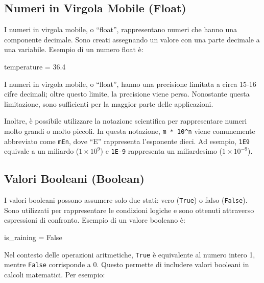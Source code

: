 \documentclass[
  letterpaper,
  krantz2]{{[}./krantz{]}}
\newenvironment{Shaded}{\begin{snugshade}}{\end{snugshade}}
\newcommand{\FloatTok}[1]{\textcolor[rgb]{0.68,0.00,0.00}{#1}}
\newcommand{\NormalTok}[1]{\textcolor[rgb]{0.00,0.23,0.31}{#1}}
\newcommand{\OperatorTok}[1]{\textcolor[rgb]{0.37,0.37,0.37}{#1}}
\newcommand{\VariableTok}[1]{\textcolor[rgb]{0.07,0.07,0.07}{#1}}
\begin{document}
\subsection{Numeri in Virgola Mobile
(Float)}\label{numeri-in-virgola-mobile-float}

I numeri in virgola mobile, o ``float'', rappresentano numeri che hanno
una componente decimale. Sono creati assegnando un valore con una parte
decimale a una variabile. Esempio di un numero float è:

\begin{Shaded}
\begin{Highlighting}[]
\NormalTok{temperature }\OperatorTok{=} \FloatTok{36.4}
\end{Highlighting}
\end{Shaded}

I numeri in virgola mobile, o ``float'', hanno una precisione limitata a
circa 15-16 cifre decimali; oltre questo limite, la precisione viene
persa. Nonostante questa limitazione, sono sufficienti per la maggior
parte delle applicazioni.

Inoltre, è possibile utilizzare la notazione scientifica per
rappresentare numeri molto grandi o molto piccoli. In questa notazione,
\texttt{m\ *\ 10\^{}n} viene comunemente abbreviato come \texttt{mEn},
dove ``E'' rappresenta l'esponente dieci. Ad esempio, \texttt{1E9}
equivale a un miliardo (\(1 \times 10^9\)) e \texttt{1E-9} rappresenta
un miliardesimo (\(1 \times 10^{-9}\)).

\subsection{Valori Booleani (Boolean)}\label{valori-booleani-boolean}

I valori booleani possono assumere solo due stati: vero (\texttt{True})
o falso (\texttt{False}). Sono utilizzati per rappresentare le
condizioni logiche e sono ottenuti attraverso espressioni di confronto.
Esempio di un valore booleano è:

\begin{Shaded}
\begin{Highlighting}[]
\NormalTok{is\_raining }\OperatorTok{=} \VariableTok{False}
\end{Highlighting}
\end{Shaded}

Nel contesto delle operazioni aritmetiche, \texttt{True} è equivalente
al numero intero 1, mentre \texttt{False} corrisponde a 0. Questo
permette di includere valori booleani in calcoli matematici. Per
esempio:
\end{document}
